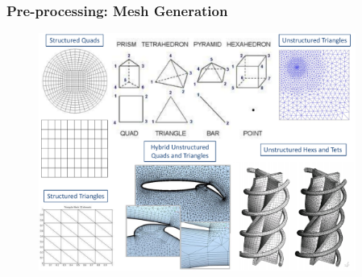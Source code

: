 \documentclass[10pt,compress, unknownkeysallowed]{beamer}
\begin{document}
\begin{frame}
 \frametitle{Pre-processing: Mesh Generation}

   \begin{figure}%
    \begin{center}
     \includegraphics[width=12.cm, height=7.8cm, clip]{./Figs/MeshGrid_Examples.pdf}\label{xx}
    \end{center}
   \end{figure}    

\end{frame}
\end{document}
